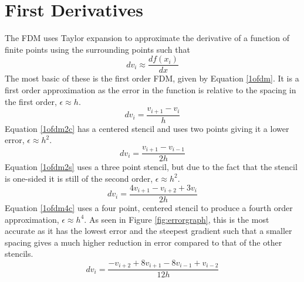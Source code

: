 \section{First Derivatives}
The FDM uses Taylor expansion to approximate the derivative of a function of finite points using the surrounding points such that
\begin{equation}
 dv_i \approx \frac{df(x_i)}{dx}
\end{equation}
The most basic of these is the first order FDM, given by Equation \ref{1ofdm}. It is a first order approximation as the error in the function is relative to the spacing in the first order, $\epsilon \approx h$.
\begin{equation} \label{1ofdm}
  dv_i = \frac{v_{i+1} - v_i}{h}
\end{equation}
Equation \ref{1ofdm2c} has a centered stencil and uses two points giving it a lower error, $\epsilon \approx h^2$.
\begin{equation} \label{1ofdm2c}
  dv_i = \frac{v_{i+1} - v_{i-1}}{2h}
\end{equation}
Equation \ref{1ofdm2s} uses a three point stencil, but due to the fact that the stencil is one-sided it is still of the second order, $\epsilon \approx h^2$.
\begin{equation} \label{1ofdm2s}
  dv_i = \frac{4v_{i+1} - v_{i+2} + 3v_i}{2h}
\end{equation}
Equation \ref{1ofdm4c} uses a four point, centered stencil to produce a fourth order approximation, $\epsilon \approx h^4$. As seen in Figure \ref{fig:errorgraph}, this is the most accurate as it has the lowest error and the steepest gradient such that a smaller spacing gives a much higher reduction in error compared to that of the other stencils.
\begin{equation} \label{1ofdm4c}
  dv_i = \frac{-v_{i+2} + 8v_{i+1} - 8v_{i-1} + v_{i-2}}{12h}
\end{equation}
